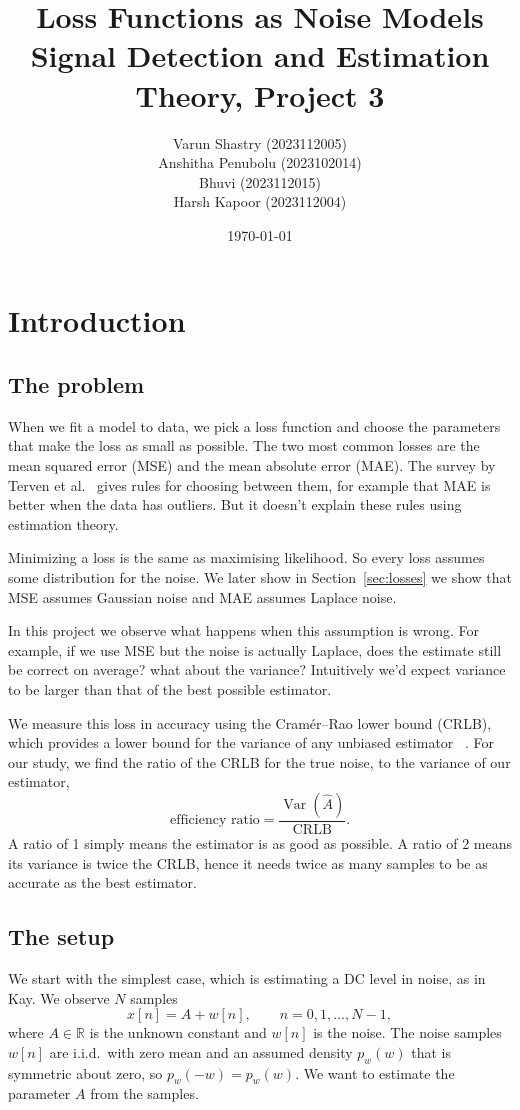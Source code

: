 \documentclass[11pt]{article}
\title{
  Loss Functions as Noise Models\\
  \vspace{15px}
  \Large Signal Detection and Estimation Theory, Project 3
}
\author{
  \Large Varun Shastry (2023112005)\\
  \Large Anshitha Penubolu (2023102014)\\
  \Large Bhuvi (2023112015)\\
  \Large Harsh Kapoor (2023112004)
}
\date{
    \today
}
\numberwithin{figure}{section}
\numberwithin{equation}{section}
\begin{document}
\maketitle

\tableofcontents
\clearpage

\section{Introduction}

\subsection{The problem}

When we fit a model to data, we pick a loss function and choose the parameters that make the
loss as small as possible. The two most common losses are the mean squared error (MSE) and the mean absolute error (MAE). The survey by Terven et al.~\cite{terven} gives rules for choosing between them, for example that MAE is better when the data has outliers. But it doesn't explain these rules using estimation theory.

Minimizing a loss is the same as maximising likelihood. So every loss assumes some
distribution for the noise. We later show in Section~\ref{sec:losses} we show that MSE assumes Gaussian noise and MAE assumes Laplace noise.

In this project we observe what happens when this assumption is wrong. For example, if we use MSE but the noise is actually Laplace, does the estimate still be correct on average? what about the variance? Intuitively we'd expect variance to be larger than that of the best possible estimator.

We measure this loss in accuracy using the Cram\'er--Rao lower bound (CRLB), which provides a lower bound for the variance of any unbiased estimator ~\cite{kay}. For our study, we find the ratio of the CRLB for the true noise, to the variance of our estimator,
\[
  \text{efficiency ratio} = \frac{\operatorname{Var}(\hat A)}{\text{CRLB}}.
\]
A ratio of 1 simply means the estimator is as good as possible. A ratio of 2 means its variance is twice the CRLB, hence it needs twice as many samples to be as accurate as the best estimator.

\subsection{The setup}

We start with the simplest case, which is estimating a DC level in noise, as in Kay. We observe $N$ samples
\begin{equation}
  x[n] = A + w[n], \qquad n = 0, 1, \dots, N-1,
  \label{eq:dc}
\end{equation}
where $A \in \mathbb{R}$ is the unknown constant and $w[n]$ is the noise. The noise samples $w[n]$ are i.i.d.\ with zero mean and an assumed density $p_w(w)$ that is symmetric about zero, so $p_w(-w) = p_w(w)$. We want to estimate the parameter $A$ from the samples.
\end{document}
